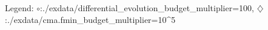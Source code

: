 Legend: {\color{NavyBlue}$\circ$}:./exdata/differential\_evolution\_budget\_multiplier=100, {\color{Magenta}$\diamondsuit$}:./exdata/cma.fmin\_budget\_multiplier=10^5